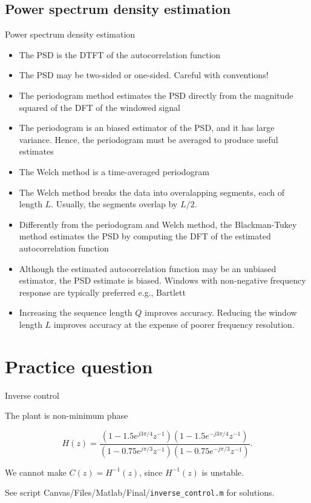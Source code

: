 \documentclass[10pt]{beamer}
\begin{document}
\subsection{Power spectrum density estimation}
\begin{frame}{Power spectrum density estimation}
\begin{itemize}
	\item The PSD is the DTFT of the autocorrelation function
	\item The PSD may be two-sided or one-sided. Careful with conventions!
	\item The periodogram method estimates the PSD directly from the magnitude squared of the DFT of the windowed signal
	\item The periodogram is an biased estimator of the PSD, and it has large variance. Hence, the periodogram must be averaged to produce useful estimates
	\item The Welch method is a time-averaged periodogram
	\item The Welch method breaks the data into overalapping segments, each of length $L$. Usually, the segments overlap by $L/2$.
	\item Differently from the periodogram and Welch method, the Blackman-Tukey method estimates the PSD by computing the DFT of the estimated autocorrelation function
	\item Although the estimated autocorrelation function may be an unbiased estimator, the PSD estimate is biased. Windows with non-negative frequency response are typically preferred e.g., Bartlett
	\item Increasing the sequence length $Q$ improves accuracy. Reducing the window length $L$ improves accuracy at the expense of poorer frequency resolution.
\end{itemize}
\end{frame}

\section{Practice question}
\begin{frame}{Inverse control}
\begin{center}
	\resizebox{0.7\textwidth}{!}{}
\end{center}

The plant is non-minimum phase

\begin{equation*}
H(z) = \frac{(1 - 1.5e^{j3\pi/4}z^{-1})(1 - 1.5e^{-j3\pi/4}z^{-1})}{(1 - 0.75e^{j\pi/3}z^{-1})(1 - 0.75e^{-j\pi/3}z^{-1})}.
\end{equation*}

We cannot make $C(z) = H^{-1}(z)$, since $H^{-1}(z)$ is unstable.

\vspace{0.5cm}
See script Canvas/Files/Matlab/Final/\texttt{inverse\_control.m} for solutions.
\end{frame}
\end{document}
